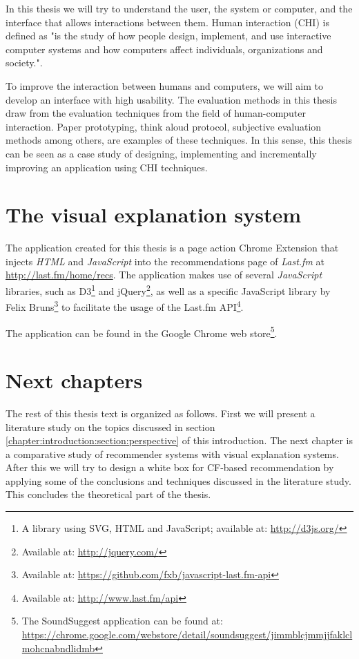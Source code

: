 In this thesis we will try to understand the user, the system or computer, and the interface that allows interactions between them. Human interaction (CHI) is defined as "is the study of how people design, implement, and use interactive computer systems and how computers affect individuals, organizations and society."\cite{tripathi:2011}.

To improve the interaction between humans and computers, we will aim to develop an interface with high usability. The evaluation methods in this thesis draw from the evaluation techniques from the field of human-computer interaction. Paper prototyping, think aloud protocol, subjective evaluation methods among others, are examples of these techniques\cite{nielsen:1993:UE:529793}. In this sense, this thesis can be seen as a case study of designing, implementing and incrementally improving an application using CHI techniques.


\section{The visual explanation system}\label{chapter:introduction:section:application}

The application created for this thesis is a page action Chrome Extension that injects \emph{HTML} and \emph{JavaScript} into the recommendations page of \emph{Last.fm} at \url{http://last.fm/home/recs}. The application makes use of several \emph{JavaScript} libraries, such as D3\footnote{A library using SVG, HTML and JavaScript\cite{bostock:2012:d3js}; available at: \url{http://d3js.org/}} and jQuery\footnote{Available at: \url{http://jquery.com/}}, as well as a specific JavaScript library by Felix Bruns\footnote{Available at: \url{https://github.com/fxb/javascript-last.fm-api}} to facilitate the usage of the Last.fm API\footnote{Available at: \url{http://www.last.fm/api}}.

The application can be found in the Google Chrome web store\footnote{The SoundSuggest application can be found at: \url{https://chrome.google.com/webstore/detail/soundsuggest/jimmblcjmmjjfaklclmohcnabndlidmb}}.


\section{Next chapters}\label{chapter:introduction:section:chapters}

The rest of this thesis text is organized as follows. First we will present a literature study on the topics discussed in section \ref{chapter:introduction:section:perspective} of this introduction. The next chapter is a comparative study of recommender systems with visual explanation systems. After this we will try to design a white box for CF-based recommendation by applying some of the conclusions and techniques discussed in the literature study. This concludes the theoretical part of the thesis.

